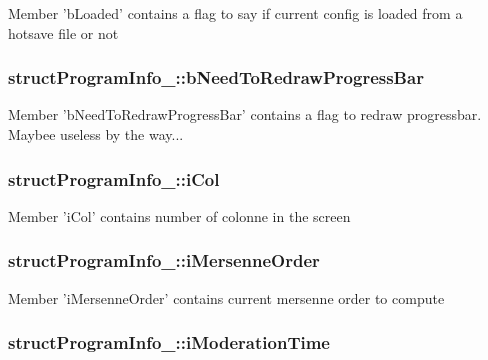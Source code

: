 Member 'b\-Loaded' contains a flag to say if current config is loaded from a hotsave file or not \hypertarget{structstructProgramInfo___a06630e04cfe7ef03f3450b8a8b8a8b10}{
\subsubsection[{b\-Need\-To\-Redraw\-Progress\-Bar}]{\setlength{\rightskip}{0pt plus 5cm}struct\-Program\-Info\-\_\-\-::b\-Need\-To\-Redraw\-Progress\-Bar}}\label{structstructProgramInfo___a06630e04cfe7ef03f3450b8a8b8a8b10}
Member 'b\-Need\-To\-Redraw\-Progress\-Bar' contains a flag to redraw progressbar. Maybee useless by the way... \hypertarget{structstructProgramInfo___a17057266190757980ed9cd6c2b213815}{
\subsubsection[{i\-Col}]{\setlength{\rightskip}{0pt plus 5cm}struct\-Program\-Info\-\_\-\-::i\-Col}}\label{structstructProgramInfo___a17057266190757980ed9cd6c2b213815}
Member 'i\-Col' contains number of colonne in the screen \hypertarget{structstructProgramInfo___ad4389f2d8e443aeb9192c279c92fc77b}{
\subsubsection[{i\-Mersenne\-Order}]{\setlength{\rightskip}{0pt plus 5cm}struct\-Program\-Info\-\_\-\-::i\-Mersenne\-Order}}\label{structstructProgramInfo___ad4389f2d8e443aeb9192c279c92fc77b}
Member 'i\-Mersenne\-Order' contains current mersenne order to compute \hypertarget{structstructProgramInfo___a3a483cd24d5480e5bb013ca804a12157}{
\subsubsection[{i\-Moderation\-Time}]{\setlength{\rightskip}{0pt plus 5cm}struct\-Program\-Info\-\_\-\-::i\-Moderation\-Time}}\label{structstructProgramInfo___a3a483cd24d5480e5bb013ca804a12157}
